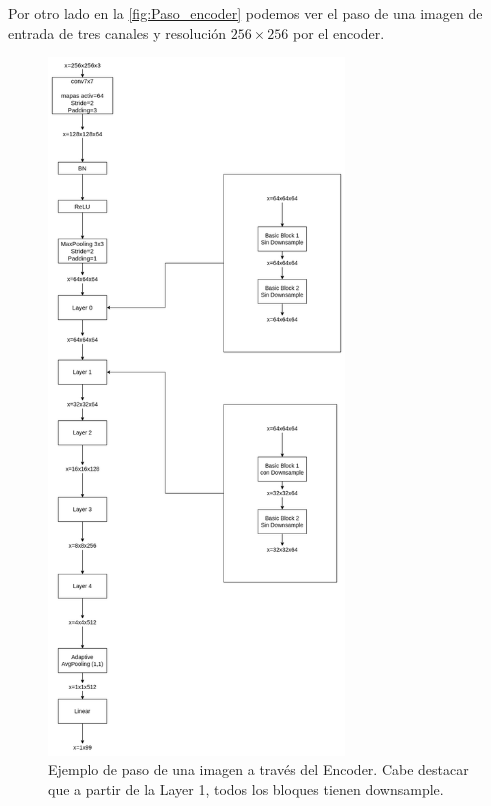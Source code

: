             \medskip 

            \noindent Por otro lado en la \autoref{fig:Paso_encoder} podemos ver el paso de una imagen de entrada de tres canales y resolución $256 \times 256$ por el encoder.

            \begin{figure}[!h]
                \centering
                \includegraphics[width=0.7\textwidth]{img/3FabRec-Page-2.drawio.png}
                \caption{Ejemplo de paso de una imagen a través del Encoder. Cabe destacar que a partir de la Layer 1, todos los bloques tienen downsample.}
                \label{fig:Paso_encoder}
            \end{figure}

